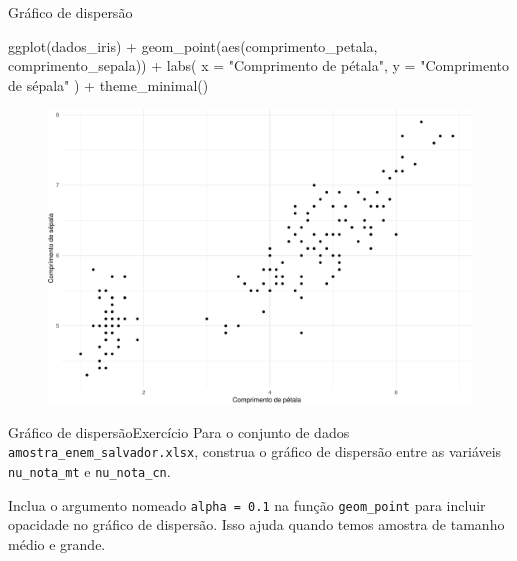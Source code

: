\documentclass[
  10pt,
  ignorenonframetext,
]{beamer}
\newenvironment{Shaded}{\begin{snugshade}}{\end{snugshade}}
\newcommand{\AttributeTok}[1]{\textcolor[rgb]{0.40,0.45,0.13}{#1}}
\newcommand{\FunctionTok}[1]{\textcolor[rgb]{0.28,0.35,0.67}{#1}}
\newcommand{\NormalTok}[1]{\textcolor[rgb]{0.00,0.23,0.31}{#1}}
\newcommand{\SpecialCharTok}[1]{\textcolor[rgb]{0.37,0.37,0.37}{#1}}
\newcommand{\StringTok}[1]{\textcolor[rgb]{0.13,0.47,0.30}{#1}}
\begin{document}
\begin{frame}[fragile]{Gráfico de dispersão}
\protect\hypertarget{gruxe1fico-de-dispersuxe3o}{}
\begin{Shaded}
\begin{Highlighting}[]
\FunctionTok{ggplot}\NormalTok{(dados\_iris) }\SpecialCharTok{+}
  \FunctionTok{geom\_point}\NormalTok{(}\FunctionTok{aes}\NormalTok{(comprimento\_petala, comprimento\_sepala)) }\SpecialCharTok{+}
  \FunctionTok{labs}\NormalTok{(}
    \AttributeTok{x =} \StringTok{"Comprimento de pétala"}\NormalTok{,}
    \AttributeTok{y =} \StringTok{"Comprimento de sépala"}
\NormalTok{  ) }\SpecialCharTok{+}
  \FunctionTok{theme\_minimal}\NormalTok{()}
\end{Highlighting}
\end{Shaded}
\end{frame}

\begin{frame}
\begin{figure}

{\centering \includegraphics[width=1\textwidth,height=\textheight]{exploracao-visualizacao_files/figure-beamer/unnamed-chunk-121-1.pdf}

}

\end{figure}
\end{frame}

\begin{frame}[fragile]{Gráfico de dispersão\newline Exercício}
\protect\hypertarget{gruxe1fico-de-dispersuxe3oexercuxedcio}{}
Para o conjunto de dados \texttt{amostra\_enem\_salvador.xlsx}, construa
o gráfico de dispersão entre as variáveis \texttt{nu\_nota\_mt} e
\texttt{nu\_nota\_cn}.

Inclua o argumento nomeado \texttt{alpha\ =\ 0.1} na função
\texttt{geom\_point} para incluir opacidade no gráfico de dispersão.
Isso ajuda quando temos amostra de tamanho médio e grande.
\end{frame}
\end{document}
